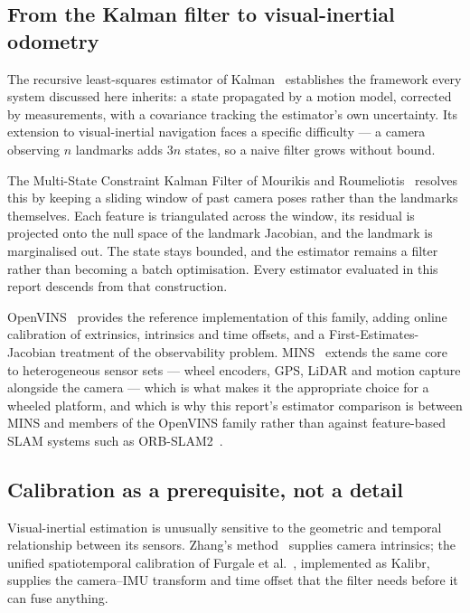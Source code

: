 \subsection{From the Kalman filter to visual-inertial odometry}

The recursive least-squares estimator of Kalman~\cite{kalman1960new}
establishes the framework every system discussed here inherits: a state
propagated by a motion model, corrected by measurements, with a covariance
tracking the estimator's own uncertainty. Its extension to visual-inertial
navigation faces a specific difficulty --- a camera observing $n$ landmarks
adds $3n$ states, so a naive filter grows without bound.

The Multi-State Constraint Kalman Filter of
Mourikis and Roumeliotis~\cite{mourikis2007msckf} resolves this by keeping a
sliding window of past camera poses rather than the landmarks themselves.
Each feature is triangulated across the window, its residual is projected
onto the null space of the landmark Jacobian, and the landmark is
marginalised out. The state stays bounded, and the estimator remains a
filter rather than becoming a batch optimisation. Every estimator evaluated
in this report descends from that construction.

OpenVINS~\cite{geneva2020openvins} provides the reference implementation of
this family, adding online calibration of extrinsics, intrinsics and time
offsets, and a First-Estimates-Jacobian treatment of the observability
problem. MINS~\cite{lee2023mins,lee2025minsjfr} extends the same core to
heterogeneous sensor sets --- wheel encoders, GPS, LiDAR and motion capture
alongside the camera --- which is what makes it the appropriate choice for a
wheeled platform, and which is why this report's estimator comparison is
between MINS and members of the OpenVINS family rather than against
feature-based SLAM systems such as ORB-SLAM2~\cite{murartal2017orbslam2}.

\subsection{Calibration as a prerequisite, not a detail}

Visual-inertial estimation is unusually sensitive to the geometric and
temporal relationship between its sensors. Zhang's
method~\cite{zhang2000flexible} supplies camera intrinsics; the unified
spatiotemporal calibration of Furgale et al.~\cite{furgale2013kalibr},
implemented as Kalibr, supplies the camera--IMU transform and time offset
that the filter needs before it can fuse anything.

